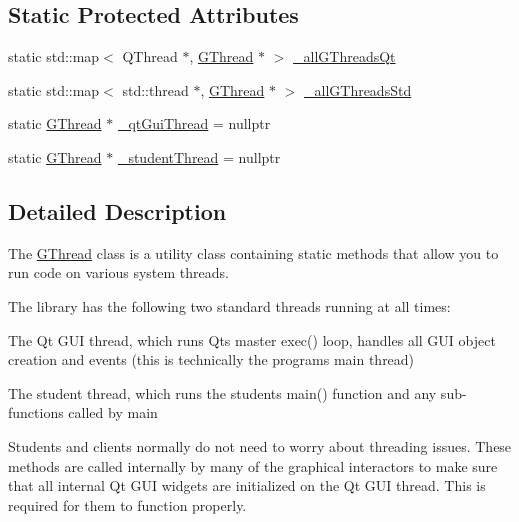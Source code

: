 \subsection*{Static Protected Attributes}
\begin{DoxyCompactItemize}
\item 
static std\+::map$<$ Q\+Thread $\ast$, \mbox{\hyperlink{classGThread}{G\+Thread}} $\ast$ $>$ \mbox{\hyperlink{classGThread_a70101b45edebc3c3a381ba4e52aca4f7}{\+\_\+all\+G\+Threads\+Qt}}
\item 
static std\+::map$<$ std\+::thread $\ast$, \mbox{\hyperlink{classGThread}{G\+Thread}} $\ast$ $>$ \mbox{\hyperlink{classGThread_a55c8fd504abcec8e9e40041df4f82787}{\+\_\+all\+G\+Threads\+Std}}
\item 
static \mbox{\hyperlink{classGThread}{G\+Thread}} $\ast$ \mbox{\hyperlink{classGThread_aef7ee9df2bdac5bd63cfb14c7f3e0881}{\+\_\+qt\+Gui\+Thread}} = nullptr
\item 
static \mbox{\hyperlink{classGThread}{G\+Thread}} $\ast$ \mbox{\hyperlink{classGThread_a750c577447f70d13a43a12ec37db86d5}{\+\_\+student\+Thread}} = nullptr
\end{DoxyCompactItemize}


\subsection{Detailed Description}
The \mbox{\hyperlink{classGThread}{G\+Thread}} class is a utility class containing static methods that allow you to run code on various system threads. 

The library has the following two standard threads running at all times\+:


\begin{DoxyEnumerate}
\item The Qt G\+UI thread, which runs Qt\textquotesingle{}s master exec() loop, handles all G\+UI object creation and events (this is technically the program\textquotesingle{}s main thread)


\item The student thread, which runs the student\textquotesingle{}s main() function and any sub-\/functions called by main 
\end{DoxyEnumerate}

Students and clients normally do not need to worry about threading issues. These methods are called internally by many of the graphical interactors to make sure that all internal Qt G\+UI widgets are initialized on the Qt G\+UI thread. This is required for them to function properly.

